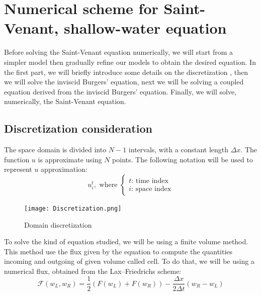             
            
            
            
            
            
            
            
            
            
    
\newpage
\section{Numerical scheme for  Saint-Venant, shallow-water equation}
    Before solving the Saint-Venant equation numerically, we will start from a simpler model then gradually refine our models to obtain the desired equation. In the first part, we will briefly introduce some details on the discretization , then we will solve the  inviscid Burgers' equation, next we will be solving a coupled equation derived from the  inviscid Burgers' equation. Finally, we will solve, numerically, the Saint-Venant equation.
    
    \subsection{Discretization consideration}
            
        The space domain is divided into $N-1$ intervals, with a constant length $\Delta x$. The function $u$ is approximate using $N$ points.
        The following notation will be used to represent $u$ approximation:
        \begin{equation*}
            u^t_i, \text{ where }
            \begin{cases}
                t\text{: time index}\\
                i\text{: space index}
            \end{cases}
        \end{equation*}
        
        \begin{figure}[h]
            \centering
            \texttt{[image: Discretization.png]}
            \caption{Domain discretization}
            \label{discret}
        \end{figure}
        
        
        
        To solve the kind of equation studied, we will be using a finite volume method. This method use the flux given by the equation to compute the quantities incoming and outgoing of given volume called cell. To do that, we will be using a numerical flux, obtained from the Lax–Friedrichs scheme:
        \begin{equation}
            \mathcal{F}(w_L,w_R) = \frac{1}{2}(F(w_L) + F(w_R)) - \frac{\Delta x}{2\Delta t}(w_R-w_L)
        \end{equation}
        
